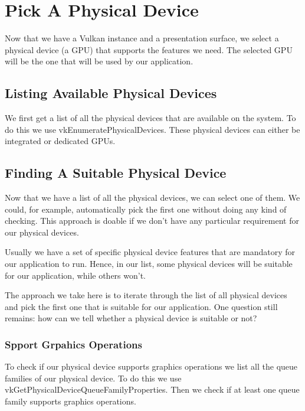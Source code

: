 \section{Pick A Physical Device}

Now that we have a Vulkan instance and a presentation surface, we select
a physical device (a GPU) that supports the features we need.
The selected GPU will be the one that will be used by our application.

\subsection{Listing Available Physical Devices}

We first get a list of all the physical devices that are available on the
system.
To do this we use vkEnumeratePhysicalDevices.
These physical devices can either be integrated or dedicated GPUs.

\subsection{Finding A Suitable Physical Device}

Now that we have a list of all the physical devices, we can select one of them.
We could, for example, automatically pick the first one without doing any kind
of checking.
This approach is doable if we don't have any particular requirement for our
physical devices.

Usually we have a set of specific physical device features that are mandatory
for our application to run.
Hence, in our list, some physical devices will be suitable for our application, while
others won't.

The approach we take here is to iterate through the list of all physical devices and
pick the first one that is suitable for our application.
One question still remains: how can we tell whether a physical device is suitable or not?

\subsubsection{Spport Grpahics Operations}

To check if our physical device supports graphics operations we list all
the queue families of our physical device.
To do this we use vkGetPhysicalDeviceQueueFamilyProperties.
Then we check if at least one queue family supports graphics operations.

\begin{minipage}{\linewidth}{\noindent}
    
\end{minipage}

